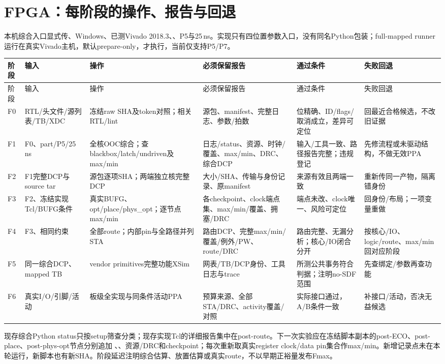 \section{FPGA：每阶段的操作、报告与回退}
本机综合入口显式传、Windows、已测Vivado 2018.3、、P5与25\,ns。实现只有四位置参数入口，没有同名Python包装；full-mapped runner运行在真实Vivado主机，默认prepare-only，才执行，当前仅支持P5/P7。
\begingroup\scriptsize\setlength{\tabcolsep}{3pt}
\begin{longtable}{p{12mm}p{21mm}p{30mm}p{36mm}p{29mm}p{25mm}}
\toprule 阶段&输入&操作&必须保留报告&通过条件&失败回退\\\midrule\endfirsthead
\toprule 阶段&输入&操作&必须保留报告&通过条件&失败回退\\\midrule\endhead
F0&RTL/头文件/源列表/TB/XDC&冻结raw SHA及token对照；相关RTL/lint&源包、manifest、完整日志、参数/拍数&位精确、ID/flags/取消成立，差异可定位&回最近合格候选，不改旧证据\\
F1&F0、part/P5/25\,ns&全核OOC综合；查blackbox/latch/undriven及max/min&日志/status、资源、时钟/覆盖、max/min、DRC、综合DCP&输入/工具一致、路径报告完整；违规登记&先修流程或未驱动结构，不做无效PPA\\
F2&F1完整DCP与source tar&源包逐项SHA；两端独立核完整DCP&大小/SHA、传输与身份记录、原manifest&来源有效且两端一致&重新传同一产物，隔离错身份\\
F3&F2、冻结实现Tcl/BUFG条件&真实BUFG、opt/place/phys\_opt；逐节点max/min&各checkpoint、clock端点集、max/min/覆盖、拥塞/DRC&端点未改、clock唯一、风险可定位&回身份/布局；一项变量重做\\
F4&F3、相同约束&全部route；内部pin与全路径并列STA&路由DCP、完整max/min/覆盖/例外/PW、route/DRC&路由完整、无漏分析；核心/IO闭合分开&按核心/IO、logic/route、max/min回对应阶段\\
F5&同一综合DCP、mapped TB&vendor primitives完整功能XSim&网表/TB/DCP身份、工具日志与trace&所测公共事务符合判据；注明no-SDF范围&先查绑定/参数再查功能\\
F6&真实I/O/引脚/活动&板级全实现与同条件活动PPA&预算来源、全部STA/DRC、activity覆盖/对照&实际接口通过，A/B条件一致&补接口/活动，否决无益候选\\
\bottomrule\end{longtable}\endgroup

现存综合Python status只按setup筛查分类；现存实现Tcl的详细报告集中在post-route。下一次实验应在冻结脚本副本的post-ECO、post-place、post-phys-opt节点分别追加   、、资源/DRC和checkpoint；每次重新取真实register clock/data pin集合作max/min。新增记录点未在本轮运行，新脚本也有新SHA。阶段延迟注明综合估算、放置估算或真实route，不以早期正裕量发布Fmax。

